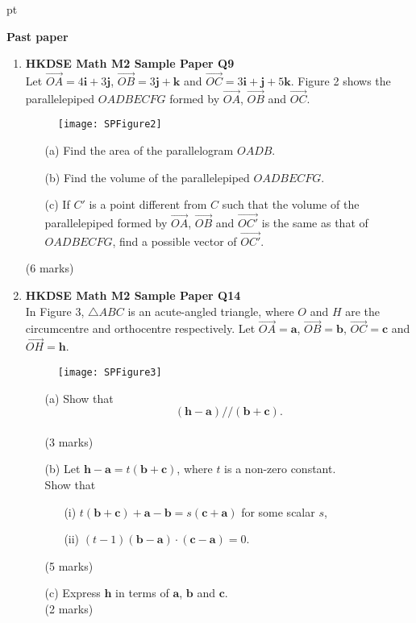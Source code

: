 \documentclass[12pt]{article}
\begin{document}
 pt
\begin{center}
	{\large \bf Past paper}
\end{center}
\vspace{0.05cm}
\begin{enumerate}
	\item \textbf{HKDSE Math M2 Sample Paper Q9}\\
	Let $\overrightarrow{OA} = 4\textbf{i} +3 \textbf{j}$, $\overrightarrow{OB} = 3 \textbf{j} +\textbf {k}$ and $\overrightarrow{OC} = 3\textbf{i} + \textbf{j} +5\textbf {k}$. Figure 2 shows the parallelepiped $OADBECFG$ formed by $\overrightarrow{OA}$, $\overrightarrow{OB}$ and $\overrightarrow{OC}$. 
	\begin{figure}[H]
		\centering
		\texttt{[image: SPFigure2]}
	\end{figure}
	\begin{enumerate}
		\item [(a)]Find the area of the parallelogram $OADB$.  
		\item [(b)]Find the volume of the parallelepiped $OADBECFG$.
		\item [(c)]If $C'$ is a point different from $C$ such that the volume of the parallelepiped formed by $\overrightarrow{OA}$, $\overrightarrow{OB}$ and $\overrightarrow{OC'}$ is the same as that of $OADBECFG$, find a possible vector of $\overrightarrow{OC'}$.
	\end{enumerate}
	(6 marks)

	\newpage
	
	\item \textbf{HKDSE Math M2 Sample Paper Q14}\\
	In Figure 3, $\triangle ABC$ is an acute-angled triangle, where $O$ and $H$ are the circumcentre and orthocentre respectively. Let $\overrightarrow{OA} = \textbf{a}$, $\overrightarrow{OB} = \textbf{b}$, $\overrightarrow{OC} = \textbf{c}$ and $\overrightarrow{OH} = \textbf{h}$.
	\begin{figure}[H]
		\centering
		\texttt{[image: SPFigure3]}
	\end{figure}
	\begin{enumerate}
		\item [(a)]Show that $$(\textbf{h} - \textbf{a})//(\textbf{b}+\textbf{c}).$$ \\(3 marks)
		\item [(b)]Let $\textbf{h} - \textbf{a} = t(\textbf{b}+\textbf{c})$, where $t$ is a non-zero constant.\\
		Show that 
		\begin{enumerate}
			\item [(i)]$t(\textbf{b}+\textbf{c}) + \textbf{a} - \textbf{b} = s(\textbf{c}+\textbf{a})$ for some scalar $s$, 
			\item [(ii)]$(t-1)(\textbf{b}-\textbf{a})\cdot (\textbf{c}-\textbf{a}) = 0$.
		\end{enumerate}
		(5 marks)
		\item[(c)]Express $\textbf{h}$ in terms of $\textbf{a}$, $\textbf{b}$ and $\textbf{c}$. \\(2 marks)
	\end{enumerate}


\end{enumerate}
\end{document}
